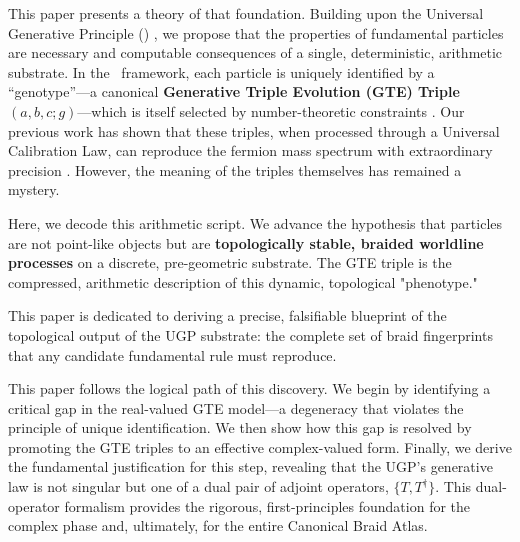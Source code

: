 \documentclass[11pt]{article}
\theoremstyle{remark}
\newcommand{\UGP}{\text{UGP}}
\begin{document}
\begin{sloppypar}
This paper presents a theory of that foundation. Building upon the Universal Generative Principle (\UGP) \cite{spivack2025main_ugp_paper,spivack2025ugp_orientation,SpivackUGPFormalization,ugp-lean}, we propose that the properties of fundamental particles are necessary and computable consequences of a single, deterministic, arithmetic substrate. In the \UGP\ framework, each particle is uniquely identified by a ``genotype''---a canonical \textbf{Generative Triple Evolution (GTE) Triple} $(a, b, c; g)$---which is itself selected by number-theoretic constraints \cite{spivack2025ugp_uniqueness}. Our previous work has shown that these triples, when processed through a Universal Calibration Law, can reproduce the fermion mass spectrum with extraordinary precision \cite{spivack2025unified_deterministic_framework}. However, the meaning of the triples themselves has remained a mystery.
\end{sloppypar}

Here, we decode this arithmetic script. We advance the hypothesis that particles are not point-like objects but are \textbf{topologically stable, braided worldline processes} on a discrete, pre-geometric substrate. The GTE triple is the compressed, arithmetic description of this dynamic, topological "phenotype."

This paper is dedicated to deriving a precise, falsifiable blueprint of the topological output of the UGP substrate: the complete set of braid fingerprints that any candidate fundamental rule must reproduce.

This paper follows the logical path of this discovery. We begin by identifying a critical gap in the real-valued GTE model---a degeneracy that violates the principle of unique identification. We then show how this gap is resolved by promoting the GTE triples to an effective complex-valued form. Finally, we derive the fundamental justification for this step, revealing that the UGP's generative law is not singular but one of a dual pair of adjoint operators, $\{T, T^\dagger\}$. This dual-operator formalism provides the rigorous, first-principles foundation for the complex phase and, ultimately, for the entire Canonical Braid Atlas.
\end{document}
